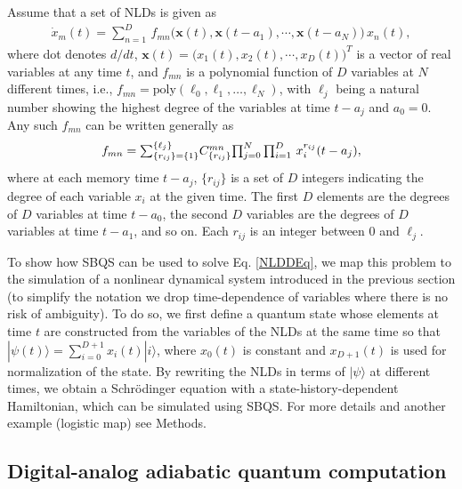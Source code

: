 \documentclass[aps,pra,twocolumn,floatfix,groupedaddress,superscriptaddress,nofootinbib,notitlepage]{revtex4-2}
\begin{document}
Assume that a set of NLDs is given as
\begin{align}
\dot{x}_{m}(t) = \textstyle{\sum}_{n=1}^{D} \, f_{mn} \big(\boldsymbol{x}(t),\boldsymbol{x}(t-a_{1}),\cdots, \boldsymbol{x}(t-a_{N})\big)\, x_{n}(t),
\label{NLDDEq}
\end{align}
where dot denotes $d/dt$, $\boldsymbol{x}(t) = \big(x_{1}(t),x_{2}(t),\cdots,x_{D}(t)\big)^{T}$ is a vector of real variables at any time $t$, and $f_{mn}$ is a polynomial function of $D$ variables at $N$ different times, i.e., $f_{mn}=\mathrm{poly}(\ell_{0},\ell_{1},\ldots, \ell_{N})$, with $\ell_{j}$ being a natural number showing the highest degree of the variables at time $t-a_{j}$ and $a_{0}=0$. Any such $f_{mn}$ can be written generally as 
\begin{align}
f_{mn}=\textstyle{\sum}_{\{r_{ij}\}=\{1\}}^{\{\ell_{j}\}} C^{mn}_{\{r_{ij}\}} \textstyle{\prod_{j=0}^{N}} \prod_{i=1}^{D} \, x_{i}^{r_{ij}}(t-a_{j}), 
\label{f_{m}n-poly}
\end{align}
where at each memory time $t-a_{j}$, $\{r_{ij}\}$ is a set of $D$ integers indicating the degree of each variable $x_{i}$ at the given time. The first $D$ elements are the degrees of $D$ variables at time $t-a_{0}$, the second $D$ variables are the degrees of $D$ variables at time $t-a_{1}$, and so on. Each $r_{ij}$ is an integer between $0$ and $\ell_{j}$.

To show how SBQS can be used to solve Eq. \eqref{NLDDEq}, we map this problem to the simulation of a nonlinear dynamical system introduced in the previous section (to simplify the notation we drop time-dependence of variables where there is no risk of ambiguity). To do so, we first define a quantum state whose elements at time $t$ are constructed from the variables of the NLDs at the same time so that $
|\psi(t)\rangle=\textstyle{\sum_{i=0}^{D+1}} x_{i}(t)|i\rangle$, where $x_0(t)$ is constant and $x_{D+1}(t)$ is used for normalization of the state. By rewriting the NLDs in terms of $|\psi\rangle$ at different times, we obtain a Schr\"{o}dinger equation with a state-history-dependent Hamiltonian, which can be simulated using SBQS. For more details and another example (logistic map) see Methods. 

\subsection{Digital-analog adiabatic quantum computation}
\label{sec:aqc}
\end{document}
